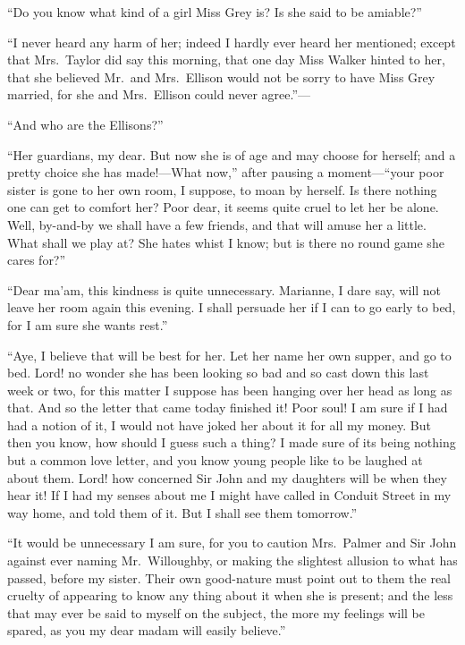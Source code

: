 ``Do you know what kind of a girl Miss Grey is?
Is she said to be amiable?''

``I never heard any harm of her; indeed I hardly ever
heard her mentioned; except that Mrs.\ Taylor did say
this morning, that one day Miss Walker hinted to her,
that she believed Mr.\ and Mrs.\ Ellison would not be sorry
to have Miss Grey married, for she and Mrs.\ Ellison could
never agree.''---%

``And who are the Ellisons?''

``Her guardians, my dear.  But now she is of age
and may choose for herself; and a pretty choice she has
made!---What now,'' after pausing a moment---``your poor sister
is gone to her own room, I suppose, to moan by herself.
Is there nothing one can get to comfort her?  Poor dear,
it seems quite cruel to let her be alone.  Well, by-and-by we
shall have a few friends, and that will amuse her a little.
What shall we play at?  She hates whist I know; but is there
no round game she cares for?''

``Dear ma'am, this kindness is quite unnecessary.
Marianne, I dare say, will not leave her room again
this evening.  I shall persuade her if I can to go
early to bed, for I am sure she wants rest.''

``Aye, I believe that will be best for her.  Let her name
her own supper, and go to bed.  Lord! no wonder she has
been looking so bad and so cast down this last week or two,
for this matter I suppose has been hanging over her head as
long as that.  And so the letter that came today finished it!
Poor soul!  I am sure if I had had a notion of it,
I would not have joked her about it for all my money.
But then you know, how should I guess such a thing?  I made
sure of its being nothing but a common love letter, and
you know young people like to be laughed at about them.  Lord!
how concerned Sir John and my daughters will be when they
hear it!  If I had my senses about me I might have called
in Conduit Street in my way home, and told them of it.
But I shall see them tomorrow.''

``It would be unnecessary I am sure, for you to caution
Mrs.\ Palmer and Sir John against ever naming Mr.\ Willoughby,
or making the slightest allusion to what has passed,
before my sister.  Their own good-nature must point out
to them the real cruelty of appearing to know any thing
about it when she is present; and the less that may ever
be said to myself on the subject, the more my feelings
will be spared, as you my dear madam will easily believe.''

